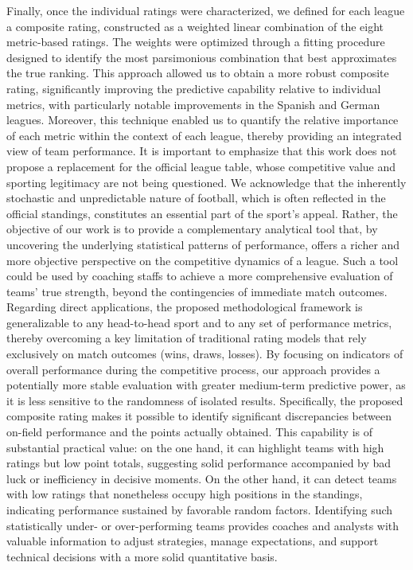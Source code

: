 \documentclass[preprint, amsmath,amssymb, pre]{revtex4-2}
\begin{document}
%
Finally, once the individual ratings were characterized, we defined for each league a composite rating, constructed as a weighted linear combination of the eight metric-based ratings. The weights were optimized through a fitting procedure designed to identify the most parsimonious combination that best approximates the true ranking. This approach allowed us to obtain a more robust composite rating, significantly improving the predictive capability relative to individual metrics, with particularly notable improvements in the Spanish and German leagues. Moreover, this technique enabled us to quantify the relative importance of each metric within the context of each league, thereby providing an integrated view of team performance.
%
It is important to emphasize that this work does not propose a replacement for the official league table, whose competitive value and sporting legitimacy are not being questioned. We acknowledge that the inherently stochastic and unpredictable nature of football, which is often reflected in the official standings, constitutes an essential part of the sport’s appeal. Rather, the objective of our work is to provide a complementary analytical tool that, by uncovering the underlying statistical patterns of performance, offers a richer and more objective perspective on the competitive dynamics of a league. Such a tool could be used by coaching staffs to achieve a more comprehensive evaluation of teams’ true strength, beyond the contingencies of immediate match outcomes.
%
Regarding direct applications, the proposed methodological framework is generalizable to any head-to-head sport and to any set of performance metrics, thereby overcoming a key limitation of traditional rating models that rely exclusively on match outcomes (wins, draws, losses). By focusing on indicators of overall performance during the competitive process, our approach provides a potentially more stable evaluation with greater medium-term predictive power, as it is less sensitive to the randomness of isolated results.
%
Specifically, the proposed composite rating makes it possible to identify significant discrepancies between on-field performance and the points actually obtained. This capability is of substantial practical value: on the one hand, it can highlight teams with high ratings but low point totals, suggesting solid performance accompanied by bad luck or inefficiency in decisive moments. On the other hand, it can detect teams with low ratings that nonetheless occupy high positions in the standings, indicating performance sustained by favorable random factors. Identifying such statistically under- or over-performing teams provides coaches and analysts with valuable information to adjust strategies, manage expectations, and support technical decisions with a more solid quantitative basis.
\end{document}
